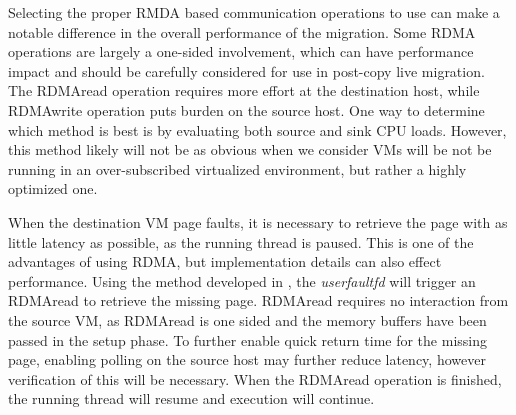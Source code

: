Selecting the proper RMDA based communication operations to use can make a notable difference in the overall performance of the migration.  
Some RDMA operations are largely a one-sided involvement, which can have performance impact and should be carefully considered for use in post-copy live migration. The RDMAread operation requires more effort at the destination host, while RDMAwrite operation puts burden on the source host.  One way to determine which method is best is by evaluating both source and sink CPU loads.  However, this method likely will not be as obvious when we consider VMs will be not be running in an over-subscribed virtualized environment, but rather a highly optimized one. 

When the destination VM page faults, it is necessary to retrieve the page with as little latency as possible, as the running thread is paused. This is one of the advantages of using RDMA, but implementation details can also effect performance. Using the method developed in \cite{www-kvm-postcopy}, the \emph{userfaultfd} will trigger an RDMAread to retrieve the missing page. RDMAread requires no interaction from the source VM, as RDMAread is one sided and the memory buffers have been passed in the setup phase. To further enable quick return time for the missing page, enabling polling on the source host may further reduce latency, however verification of this will be necessary. When the RDMAread operation is finished, the running thread will resume and execution will continue.








